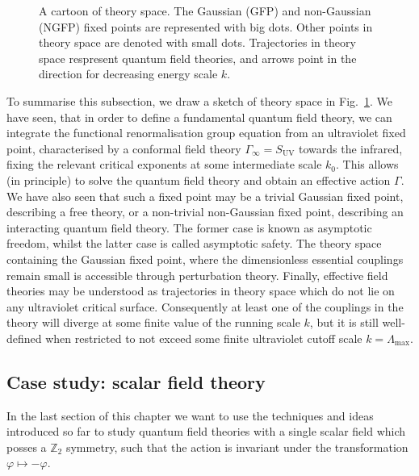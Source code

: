 \documentclass[11pt]{book}
\numberwithin{equation}{chapter}
\begin{document}
\begin{figure}
  \begin{center}
    
  \end{center}
  \vspace*{-4mm}
  \caption{
    A cartoon of theory space. The Gaussian (GFP) and non-Gaussian (NGFP)
    fixed points are represented with big dots. Other points in theory
    space are denoted with small dots. Trajectories in theory space
    respresent quantum field theories, and arrows point in the direction
    for decreasing energy scale $k$.
  }
  \label{fig:theoryspace}
\end{figure}
\bigskip
\noindent
To summarise this subsection, we draw a sketch of theory
space in Fig.~\ref{fig:theoryspace}.
We have seen, that in order to define a fundamental
quantum field theory, we can integrate the functional
renormalisation group equation from an ultraviolet
fixed point, characterised by a conformal field theory
$\Gamma_\infty = S_{\mathrm{\scriptscriptstyle{UV}}}$
towards the infrared,
fixing the relevant critical exponents at some
intermediate scale $k_0$. This allows (in principle)
to solve the quantum field theory and obtain
an effective action $\Gamma$. We have also seen
that such a fixed point may be a trivial Gaussian
fixed point, describing
a free theory,
or a non-trivial non-Gaussian fixed point, describing an
interacting quantum field theory. The former case
is known as asymptotic freedom, whilst the latter case
is called asymptotic safety. The theory space containing
the Gaussian fixed point, where the dimensionless essential
couplings remain small is accessible through perturbation
theory. Finally, effective field theories may be understood
as trajectories in theory space which do not
lie on any ultraviolet critical surface. Consequently
at least one of the couplings in the theory will diverge
at some finite value of the running scale $k$, but it is still
well-defined when restricted to not exceed some finite
ultraviolet cutoff scale
$k=\Lambda_{\mathrm{\scriptscriptstyle{max}}}$.


\subsection{Case study: scalar field theory}

In the last section of this chapter we want to use
the techniques and ideas introduced so far to study
quantum field theories with a single scalar field
which posses a $\mathbb Z_2$ symmetry, such that the
action is invariant under the transformation
$\varphi \mapsto - \varphi$.
\end{document}
